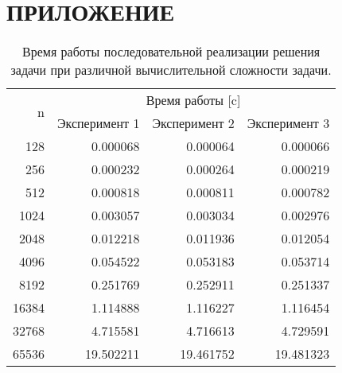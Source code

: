 \section*{ПРИЛОЖЕНИЕ}

\begin{table}[htbp]
    \centering
     \begin{tabular}{rrrr}  \toprule    \multirow{2}{*}{n}   & \multicolumn{3}{c}{Время работы {[}c{]}}                                                     \\
    & Эксперимент 1        & \multicolumn{1}{c}{Эксперимент 2} & \multicolumn{1}{c}{Эксперимент 3} \\  
    \midrule   128 &                0.000068 &                0.000064 &                0.000066  \\   256 &      0.000232 &                0.000264 &                0.000219  \\   
    512 &                0.000818 &                0.000811 &                0.000782  \\  
    1024 &                0.003057 &                0.003034 &                0.002976  \\  
    2048 &                0.012218 &                0.011936 &                0.012054  \\  
    4096 &                0.054522 &                0.053183 &                0.053714  \\  
    8192 &                0.251769 &                0.252911 &                0.251337  \\ 
    16384 &                1.114888 &                1.116227 &                1.116454  \\ 
    32768 &                4.715581 &                4.716613 &                4.729591  \\ 
    65536 &               19.502211 &               19.461752 &               19.481323  \\  \bottomrule  \end{tabular} 
    \caption{Время работы последовательной реализации решения задачи при различной вычислительной сложности задачи.}
    \label{tab:cpu_time}
\end{table}

